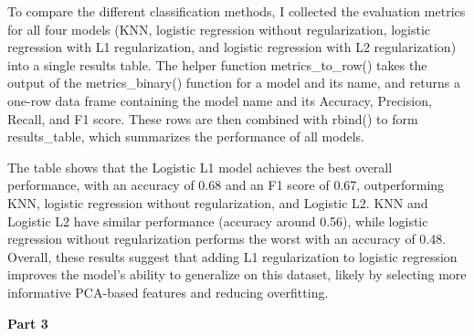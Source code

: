 \documentclass[
]{article}
\begin{document}
To compare the different classification methods, I collected the
evaluation metrics for all four models (KNN, logistic regression without
regularization, logistic regression with L1 regularization, and logistic
regression with L2 regularization) into a single results table. The
helper function metrics\_to\_row() takes the output of the
metrics\_binary() function for a model and its name, and returns a
one-row data frame containing the model name and its Accuracy,
Precision, Recall, and F1 score. These rows are then combined with
rbind() to form results\_table, which summarizes the performance of all
models.

The table shows that the Logistic L1 model achieves the best overall
performance, with an accuracy of 0.68 and an F1 score of 0.67,
outperforming KNN, logistic regression without regularization, and
Logistic L2. KNN and Logistic L2 have similar performance (accuracy
around 0.56), while logistic regression without regularization performs
the worst with an accuracy of 0.48. Overall, these results suggest that
adding L1 regularization to logistic regression improves the model's
ability to generalize on this dataset, likely by selecting more
informative PCA-based features and reducing overfitting.

\textbf{Part 3}
\end{document}
